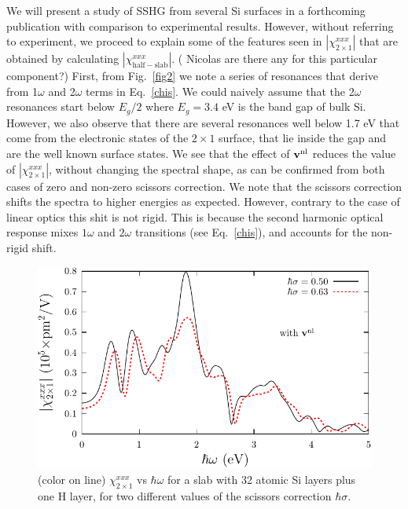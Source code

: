 \documentclass[floatfix,prb,aps,superscriptaddress,11pt,preprint,letterpaper]{revtex4}
\def\chon{red}
\begin{document}
{\color{\chon} We will present a study of SSHG from several 
Si surfaces in a forthcoming publication with comparison to experimental 
results. However, without referring to experiment, we proceed to explain 
some of the features seen in $|\chi^{xxx}_{2\times 1}|$ that are obtained 
by calculating $|\chi^{xxx}_{\mathrm{half-slab}}|$.}
({\color{red} Nicolas are there any for this particular component?})
{\color{\chon} First,} from Fig.~\ref{fig2} we note a series of resonances 
that {\color{\chon} derive from} 1$\omega$ and 2$\omega$ terms in
Eq.~\eqref{chis}. {\color{\chon} We could naively assume that the
2$\omega$ resonances} start below $E_g/2$ where $E_g=3.4$ eV is
the band gap of bulk Si. However, we also {\color{\chon} observe} 
that there are several resonances well below 1.7 eV
{\color{\chon} that come} from the electronic states of the 
$2\times 1$ surface, that lie inside the gap and are the 
well known surface states.
We see that the effect of $\mathbf{v}^{\mathrm{nl}}$ reduces the value of   
$|\chi^{xxx}_{2\times 1}|$,\cite{note2}  
without changing the 
{\color{\chon} spectral shape}, as can be confirmed from
both cases of zero and non-zero scissors correction.
{\color{\chon} We note that the scissors correction 
shifts the spectra to higher energies as expected. However, contrary 
to the case of linear optics\cite{cabellosPRB09} this shit is not 
rigid. This is because the second harmonic optical response mixes 
$1\omega$ and $2\omega$ transitions (see Eq.~\eqref{chis}), and accounts 
for the non-rigid shift.}
\begin{figure}
\centering 
\includegraphics[scale=.8]{plots/fig3}
\caption{(color on line) 
$\chi^{xxx}_{2\times 1}$
vs $\hbar\omega$ for a slab {\color{\chon} with} 32 
atomic Si layers plus one {\color{\chon} H layer}, 
for two different values of 
the scissors correction $\hbar\sigma$.
\label{fig3}} 
\end{figure}
\end{document}
